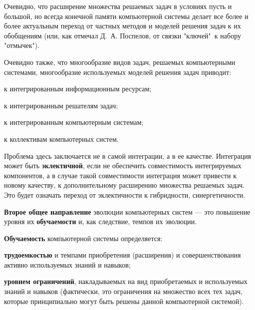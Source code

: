 Очевидно, что расширение множества решаемых задач в условиях пусть и большой, но всегда конечной памяти компьютерной системы делает все более и более актуальным переход от частных методов и моделей решения задач к их обобщениям (или, как отмечал Д.~А. Поспелов, от связки "ключей"\ к набору "отмычек").

Очевидно также, что многообразие видов задач, решаемых компьютерными системами, многообразие используемых моделей решения задач приводит: 
\begin{textitemize}
	\item к интегрированным информационным ресурсам;
	\item к интегрированным решателям задач;
	\item к интегрированным компьютерным системам;
	\item к коллективам компьютерных систем.
\end{textitemize}

Проблема здесь заключается не в самой интеграции, а в ее качестве. Интеграция может быть \textbf{эклектичной}, если не обеспечить совместимость интегрируемых компонентов, а в случае такой совместимости интеграция может привести к новому качеству, к дополнительному расширению множества решаемых задач. Это будет означать переход от эклектичности к гибридности, синергетичности.

\textbf{Второе общее направление} эволюции компьютерных систем --- это повышение уровня их \textbf{обучаемости} и, как следствие, темпов их эволюции.

\textbf{Обучаемость} компьютерной системы определяется:
\begin{textitemize}
	\item \textbf{трудоемкостью} и темпами приобретения (расширения) и совершенствования активно используемых знаний и навыков;
	\item \textbf{уровнем ограничений}, накладываемых на вид приобретаемых и используемых знаний и навыков (фактически, это ограничения на множество всех тех задач, которые принципиально могут быть решены данной компьютерной системой).
\end{textitemize}

